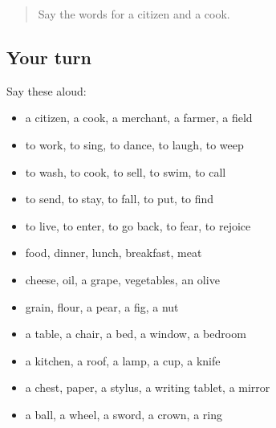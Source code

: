 \begin{quote}
Say the words for a citizen and a cook.
\end{quote}

\subsection*{Your turn}
Say these aloud:

\begin{itemize}
\raggedright
  \item a citizen, a cook, a merchant, a farmer, a field
  \item to work, to sing, to dance, to laugh, to weep
  \item to wash, to cook, to sell, to swim, to call
  \item to send, to stay, to fall, to put, to find
  \item to live, to enter, to go back, to fear, to rejoice
  \item food, dinner, lunch, breakfast, meat
  \item cheese, oil, a grape, vegetables, an olive
  \item grain, flour, a pear, a fig, a nut
  \item a table, a chair, a bed, a window, a bedroom
  \item a kitchen, a roof, a lamp, a cup, a knife
  \item a chest, paper, a stylus, a writing tablet, a mirror
  \item a ball, a wheel, a sword, a crown, a ring
\end{itemize}

